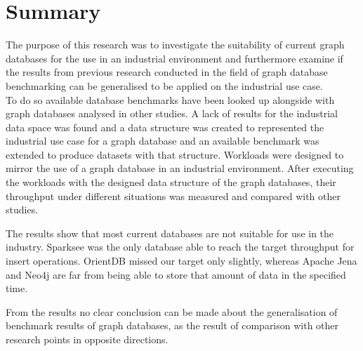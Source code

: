 \section{Summary}
The purpose of this research was to investigate the suitability of current graph databases for the use in an industrial environment and furthermore examine if the results from previous research conducted in the field of graph database benchmarking can be generalised to be applied on the industrial use case.\\
To do so available database benchmarks have been looked up alongside with graph databases analysed in other studies.
A lack of results for the industrial data space was found and a data structure was created to represented the industrial use case for a graph database and an available benchmark was extended to produce datasets with that structure.
Workloads were designed to mirror the use of a graph database in an industrial environment.
After executing the workloads with the designed data structure of the graph databases,
their throughput under different situations was measured and compared with other studies.

The results show that most current databases are not suitable for use in the industry.
Sparksee was the only database able to reach the target throughput for insert operations.
OrientDB missed our target only slightly,
whereas Apache Jena and Neo4j are far from being able to store that amount of data in the specified time.

From the results no clear conclusion can be made about the generalisation of benchmark results of graph databases,
as the result of comparison with other research points in opposite directions.
